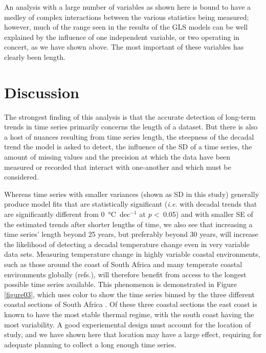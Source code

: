 \documentclass[]{ametsoc}
\begin{document}
An analysis with a large number of variables as shown here is bound to have a medley of complex interactions between the various statistics being measured; however, much of the range seen in the results of the GLS models can be well explained by the influence of one independent variable, or two operating in concert, as we have shown above. The most important of these variables has clearly been length.

\section{Discussion}
The strongest finding of this analysis is that the accurate detection of long-term trends in time series primarily concerns the length of a dataset. But there is also a host of nuances resulting from time series length, the steepness of the decadal trend the model is asked to detect, the influence of the SD of a time series, the amount of missing values and the precision at which the data have been measured or recorded that interact with one-another and which must be considered.

Whereas time series with smaller variances (shown as SD in this study) generally produce model fits that are statistically significant (\emph{i.e.} with decadal trends that are significantly different from \SI{0}{\degreeCelsius}~dec$^{-1}$ at \emph{p} \textless~0.05) and with smaller SE of the estimated trends after shorter lengths of time, we also see that increasing a time series' length beyond 25 years, but preferably beyond 30 years, will increase the likelihood of detecting a decadal temperature change even in very variable data sets. Measuring temperature change in highly variable coastal environments, such as those around the coast of South Africa and many temperate coastal environments globally (refs.), will therefore benefit from access to the longest possible time series available. This phenomenon is demonstrated in Figure \ref{figure03}, which uses color to show the time series binned by the three different coastal sections of South Africa \citep{Smit2013}. Of these three coastal sections the east coast is known to have the most stable thermal regime, with the south coast having the most variability. A good experiemental design must account for the location of study, and we have shown here that location may have a large effect, requiring for adequate planning to collect a long enough time series.
\end{document}
